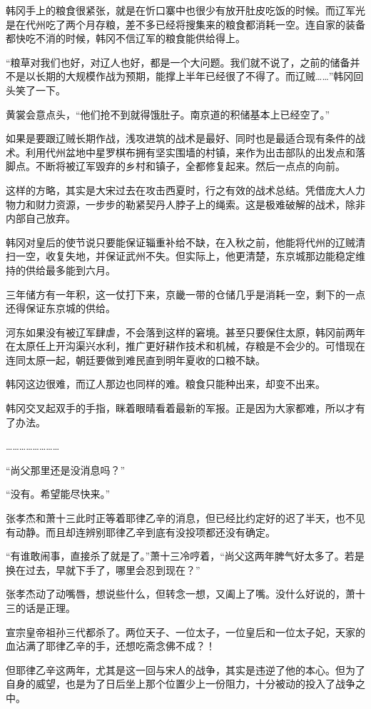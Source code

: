 韩冈手上的粮食很紧张，就是在忻口寨中也很少有放开肚皮吃饭的时候。而辽军光是在代州吃了两个月存粮，差不多已经将搜集来的粮食都消耗一空。连自家的装备都快吃不消的时候，韩冈不信辽军的粮食能供给得上。

“粮草对我们也好，对辽人也好，都是一个大问题。我们就不说了，之前的储备并不是以长期的大规模作战为预期，能撑上半年已经很了不得了。而辽贼……”韩冈回头笑了一下。

黄裳会意点头，“他们抢不到就得饿肚子。南京道的积储基本上已经空了。”

如果是要跟辽贼长期作战，浅攻进筑的战术是最好、同时也是最适合现有条件的战术。利用代州盆地中星罗棋布拥有坚实围墙的村镇，来作为出击部队的出发点和落脚点。不断将被辽军毁弃的乡村和镇子，全都修复起来。然后一点点的向前。

这样的方略，其实是大宋过去在攻击西夏时，行之有效的战术总结。凭借庞大人力物力和财力资源，一步步的勒紧契丹人脖子上的绳索。这是极难破解的战术，除非内部自己放弃。

韩冈对皇后的使节说只要能保证辎重补给不缺，在入秋之前，他能将代州的辽贼清扫一空，收复失地，并保证武州不失。但实际上，他更清楚，东京城那边能稳定维持的供给最多能到六月。

三年储方有一年积，这一仗打下来，京畿一带的仓储几乎是消耗一空，剩下的一点还得保证东京城的供给。

河东如果没有被辽军肆虐，不会落到这样的窘境。甚至只要保住太原，韩冈前两年在太原任上开沟渠兴水利，推广更好耕作技术和机械，存粮是不会少的。可惜现在连同太原一起，朝廷要做到难民直到明年夏收的口粮不缺。

韩冈这边很难，而辽人那边也同样的难。粮食只能种出来，却变不出来。

韩冈交叉起双手的手指，眯着眼晴看着最新的军报。正是因为大家都难，所以才有了办法。

……………………

“尚父那里还是没消息吗？”

“没有。希望能尽快来。”

张孝杰和萧十三此时正等着耶律乙辛的消息，但已经比约定好的迟了半天，也不见有动静。而且却连辨别耶律乙辛到底有没投项都还没有确定。

“有谁敢闹事，直接杀了就是了。”萧十三冷哼着，“尚父这两年脾气好太多了。若是换在过去，早就下手了，哪里会忍到现在？”

张孝杰动了动嘴唇，想说些什么，但转念一想，又阖上了嘴。没什么好说的，萧十三的话是正理。

宣宗皇帝祖孙三代都杀了。两位天子、一位太子，一位皇后和一位太子妃，天家的血沾满了耶律乙辛的手，还想吃斋念佛不成？！

但耶律乙辛这两年，尤其是这一回与宋人的战争，其实是违逆了他的本心。但为了自身的威望，也是为了日后坐上那个位置少上一份阻力，十分被动的投入了战争之中。

